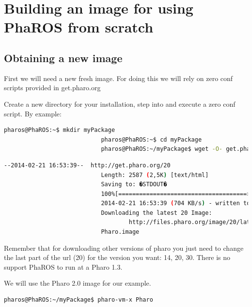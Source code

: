 \documentclass[a4paper,10pt,twoside]{book}
\begin{document}
\fi
\sloppy
\chapter{Building an image for using PhaROS from scratch}
\label{appendix:pharos-from-scratch} 
				
						\section{Obtaining a new image}
						
						First we will need a new fresh image. For doing this we will rely on zero conf scripts provided in get.pharo.org
						
						Create a new directory for your installation, step into and execute a zero conf script. By example: 
						
						\begin{lstlisting}[language=bash,title={ Downloading an Pharo 2.0 image }]
							pharos@PhaROS:~$ mkdir myPackage
							pharos@PhaROS:~$ cd myPackage
							pharos@PhaROS:~/myPackage$ wget -O- get.pharo.org/20 | bash
						\end{lstlisting}
						
						
						\begin{lstlisting}[language=bash,title={ Downloading an image - output }]
							--2014-02-21 16:53:39--  http://get.pharo.org/20
							Length: 2587 (2,5K) [text/html]
							Saving to: �STDOUT�
							100%[=====================================>] 2 587       --.-K/s   in 0,004s  
							2014-02-21 16:53:39 (704 KB/s) - written to stdout [2587/2587]
							Downloading the latest 20 Image:
    								http://files.pharo.org/image/20/latest.zip
							Pharo.image
						\end{lstlisting}
						
						Remember that for downloading other versions of pharo you just need to change the last part of the url (20) for the version you want: 14, 20, 30. 
						There is no support PhaROS to run at a Pharo 1.3.
						
						  
						We will use the Pharo 2.0 image for our example. 
						
						
						\begin{lstlisting}[language=bash,title={ Downloading an image - output }]
							pharos@PhaROS:~/myPackage$ pharo-vm-x Pharo
						\end{lstlisting}
					
\end{document}
